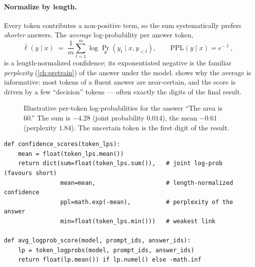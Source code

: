 \paragraph{Normalize by length.} Every token contributes a non-positive term, so the sum
systematically prefers \emph{shorter} answers. The \emph{average} log-probability per answer token,
\begin{equation}
  \bar\ell(y \mid x) \;=\; \frac{1}{m}\sum_{t=1}^{m} \log \Pr_\theta(y_t \mid x, y_{<t}),
  \qquad \mathrm{PPL}(y \mid x) = e^{-\bar\ell},
  \label{eq:refine:avg}
\end{equation}
is a length-normalized confidence; its exponentiated negative is the familiar \emph{perplexity}
(\cref{ch:pretrain}) of the answer under the model.  shows why the average
is informative: most tokens of a fluent answer are near-certain, and the score is driven by a few
``decision'' tokens --- often exactly the digits of the final result.

\begin{figure}[t]
\centering
{}
\caption{Illustrative per-token log-probabilities for the answer ``The area is 60.'' The sum is
$-4.28$ (joint probability $0.014$), the mean $-0.61$ (perplexity $1.84$). The uncertain token is the
first digit of the result.}
\label{fig:refine:pertoken}
\end{figure}

\begin{lstlisting}[caption={Confidence summaries from token log-probabilities (Lab 16, Task 3).},label={lst:refine:conf}]
def confidence_scores(token_lps):
    mean = float(token_lps.mean())
    return dict(sum=float(token_lps.sum()),   # joint log-prob (favours short)
                mean=mean,                    # length-normalized confidence
                ppl=math.exp(-mean),          # perplexity of the answer
                min=float(token_lps.min()))   # weakest link

def avg_logprob_score(model, prompt_ids, answer_ids):
    lp = token_logprobs(model, prompt_ids, answer_ids)
    return float(lp.mean()) if lp.numel() else -math.inf
\end{lstlisting}

